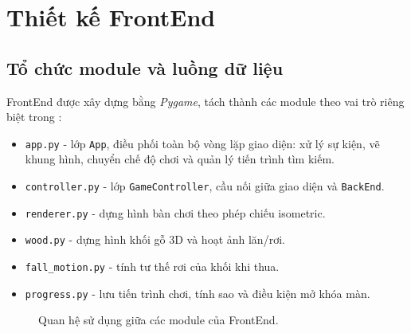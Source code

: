 \section{Thiết kế FrontEnd}
\label{sec:frontend}

\subsection{Tổ chức module và luồng dữ liệu}

FrontEnd được xây dựng bằng \textit{Pygame}, tách thành các module theo
vai trò riêng biệt trong :
\begin{itemize}
    \item \texttt{app.py} - lớp \texttt{App}, điều phối toàn bộ vòng lặp
    giao diện: xử lý sự kiện, vẽ khung hình, chuyển chế độ chơi và quản lý
    tiến trình tìm kiếm.
    \item \texttt{controller.py} - lớp \texttt{GameController}, cầu nối 
    giữa giao diện và \texttt{BackEnd}.
    \item \texttt{renderer.py} - dựng hình bàn chơi theo phép chiếu
    isometric.
    \item \texttt{wood.py} - dựng hình khối gỗ 3D và hoạt ảnh lăn/rơi.
    \item \texttt{fall\_motion.py} - tính tư thế rơi của khối khi thua.
    \item \texttt{progress.py} - lưu tiến trình chơi, tính sao và điều
    kiện mở khóa màn.
\end{itemize}

\begin{figure}[htbp]
    \centering
    \caption{Quan hệ sử dụng giữa các module của FrontEnd.}
    \label{fig:frontend_modules}
\end{figure}


